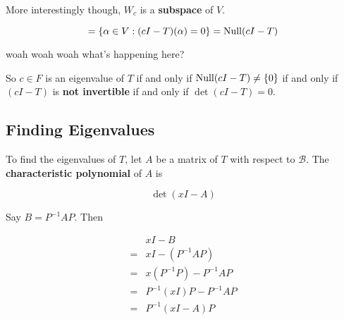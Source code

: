 \documentclass[12pt]{article}
\def\B{\mathcal B}
\begin{document}


  More interestingly though, $W_c$ is a {\bf subspace} of $V$.

  \[
    = \{\alpha \in V : (c I - T)(\alpha) = 0\} = \mathrm{Null}(cI - T)
  \]

  \QUESTION{} woah woah woah what's happening here?


  So $c \in F$ is an eigenvalue of $T$ if and only if $\mathrm{Null}(cI - T) \ne \{0\}$
  if and only if $(c I - T)$ is {\bf not invertible} if and only if $\det(c I -
  T) = 0$.

  \subsection{Finding Eigenvalues}

  To find the eigenvalues of $T$, let $A$ be a matrix of $T$ with respect to
  $\B$. The {\bf characteristic polynomial} of $A$ is

  \[
    \det(x I - A)
  \]

  {
    Say $B = P^{-1} A P$. Then

    \begin{align*}
       &x I - B \\
      =&x I - (P^{-1} A P) \\
      =&x (P^{-1} P) - P^{-1} A P \\
      =&P^{-1} (x I) P - P^{-1} A P \\
      =&P^{-1} (x I - A) P
    \end{align*}
  }

\end{document}
